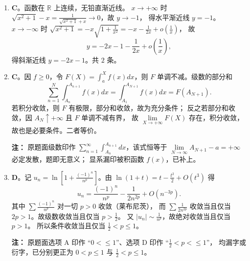 \begin{enumerate}
{\begin{enumerate}
	\par\vspace{1mm}\noindent
	\textbf{注：}{\kaishu
	原题面第三项印作 $z\,dxdy$。若按此读，由高斯公式得
	$\iiint_{\Omega}(2x+2y+1)dV=\frac43\pi R^{3}$，并不在四个选项之中；
	而四个选项的量阶均为 $R^{4}$，与被积三项全为二次时一致，
	可见应为 $z^{2}dxdy$，已据此更正题面。
	}\par

	\item
	\textbf{C}。函数在 $\mathbb{R}$ 上连续，无铅直渐近线。
	$x\to+\infty$ 时 $\sqrt{x^{2}+1}-x=\frac{1}{\sqrt{x^{2}+1}+x}\to0$，故 $y\to-1$，
	得水平渐近线 $y=-1$。
	$x\to-\infty$ 时 $\sqrt{x^{2}+1}=-x\sqrt{1+\frac{1}{x^{2}}}=-x-\frac{1}{2x}+o\!\left(\frac1x\right)$，
	故
	\[
	y=-2x-1-\frac{1}{2x}+o\!\left(\frac1x\right) ,
	\]
	得斜渐近线 $y=-2x-1$。共 $2$ 条。

	\item
	\textbf{C}。因 $f\geqslant0$，令 $F(X)=\int_{a}^{X}f(x)dx$，则 $F$ 单调不减。级数的部分和
	\[
	\sum_{n=1}^{N}\int_{A_{n}}^{A_{n+1}}f(x)dx=\int_{A_{1}}^{A_{N+1}}f(x)dx=F\left(A_{N+1}\right) .
	\]
	若积分收敛，则 $F$ 有极限，部分和收敛，故为充分条件；
	反之若部分和收敛，因 $A_{N}\uparrow+\infty$ 且 $F$ 单调不减有界，
	故 $\lim\limits_{X\to+\infty}F(X)$ 存在，积分收敛，故也是必要条件。二者等价。

	\par\vspace{1mm}\noindent
	\textbf{注：}{\kaishu
	原题面级数印作 $\sum\limits_{n=1}^{\infty}\int_{A_{n}}^{A_{n+1}}dx$，该式恒等于
	$\lim\limits_{N\to\infty}A_{N+1}-a=+\infty$ 必定发散，题即无意义；
	显系漏印被积函数 $f(x)$，已补上。
	}\par

	\item
	\textbf{D}。记 $u_{n}=\ln\left[1+\frac{(-1)^{n}}{n^{p}}\right]$。由
	$\ln(1+t)=t-\frac{t^{2}}{2}+O\left(t^{3}\right)$ 得
	\[
	u_{n}=\frac{(-1)^{n}}{n^{p}}-\frac{1}{2n^{2p}}+O\left(n^{-3p}\right) .
	\]
	其中 $\sum\frac{(-1)^{n}}{n^{p}}$ 对一切 $p>0$ 收敛（莱布尼茨），
	而 $\sum\frac{1}{2n^{2p}}$ 收敛当且仅当 $2p>1$。故级数收敛当且仅当 $p>\frac12$。
	又 $\left|u_{n}\right|\sim\frac{1}{n^{p}}$，故绝对收敛当且仅当 $p>1$。
	所以条件收敛当且仅当 $\frac12<p\leqslant1$。

	\par\vspace{1mm}\noindent
	\textbf{注：}{\kaishu
	原题面选项 A 印作 “$0<\leqslant1$”、选项 D 印作 “$\frac12<p<\leqslant1$”，
	均漏字或衍字，已分别更正为 $0<p\leqslant1$ 与 $\frac12<p\leqslant1$。
	}\par


\end{enumerate}}
\end{enumerate}
